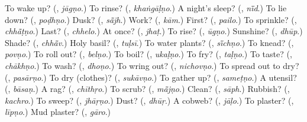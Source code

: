 \begin{tcolorbox}[breakable,colback=teal!4,colframe=teal!35!black,title={Before you move on}]
To wake up? (\textbf{}, \emph{jāgṇo}.) To rinse? (\textbf{}, \emph{khaṅgāḷṇo}.) A night's sleep? (\textbf{}, \emph{nī̃d}.) To lie down? (\textbf{}, \emph{poḍhṇo}.) Dusk? (\textbf{}, \emph{sā̃jh}.) Work? (\textbf{}, \emph{kām}.) First? (\textbf{}, \emph{pailo}.) To sprinkle? (\textbf{}, \emph{chhā̃ṭṇo}.) Last? (\textbf{}, \emph{chhelo}.) At once? (\textbf{}, \emph{jhaṭ}.) To rise? (\textbf{}, \emph{ūgṇo}.) Sunshine? (\textbf{}, \emph{dhūp}.) Shade? (\textbf{}, \emph{chhā̃v}.) Holy basil? (\textbf{}, \emph{tuḷsī}.) To water plants? (\textbf{}, \emph{sī̃chṇo}.) To knead? (\textbf{}, \emph{povṇo}.) To roll out? (\textbf{}, \emph{belṇo}.) To boil? (\textbf{}, \emph{ukaḷṇo}.) To fry? (\textbf{}, \emph{taḷṇo}.) To taste? (\textbf{}, \emph{chākhṇo}.) To wash? (\textbf{}, \emph{dhoṇo}.) To wring out? (\textbf{}, \emph{nichovṇo}.) To spread out to dry? (\textbf{}, \emph{pasārṇo}.) To dry (clothes)? (\textbf{}, \emph{sukāvṇo}.) To gather up? (\textbf{}, \emph{sameṭṇo}.) A utensil? (\textbf{}, \emph{bāsaṇ}.) A rag? (\textbf{}, \emph{chīthṛo}.) To scrub? (\textbf{}, \emph{mā̃jṇo}.) Clean? (\textbf{}, \emph{sāph}.) Rubbish? (\textbf{}, \emph{kachro}.) To sweep? (\textbf{}, \emph{jhāṛṇo}.) Dust? (\textbf{}, \emph{dhūṛ}.) A cobweb? (\textbf{}, \emph{jāḷo}.) To plaster? (\textbf{}, \emph{līpṇo}.) Mud plaster? (\textbf{}, \emph{gāro}.)
\end{tcolorbox}

